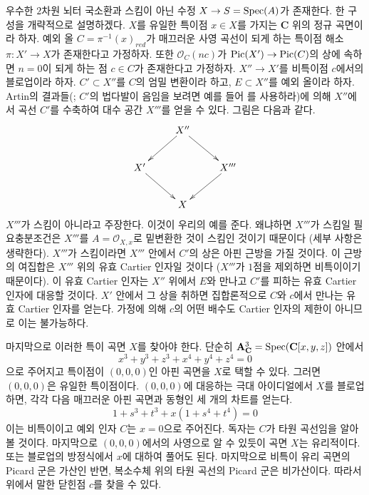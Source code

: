 \begin{example}
\label{example-not-blow-up}
우수한 $2$차원 뇌터 국소환과 스킴이 아닌 수정
$X \to S = \mathop{\mathrm{Spec}}(A)$가 존재한다.
한 구성을 개략적으로 설명하겠다. $X$를 유일한 특이점
$x \in X$를 가지는 $\mathbf{C}$ 위의 정규 곡면이라 하자.
예외 올 $C = \pi^{-1}(x)_{red}$가 매끄러운 사영 곡선이 되게 하는
특이점 해소 $\pi : X' \to X$가 존재한다고 가정하자.
또한 $\mathcal{O}_C(nc)$가 $\mathop{\mathrm{Pic}}\nolimits(X') \to \mathop{\mathrm{Pic}}\nolimits(C)$의 상에 속하면
$n = 0$이 되게 하는 점 $c \in C$가 존재한다고 가정하자.
$X'' \to X'$를 비특이점 $c$에서의 블로업이라 하자.
$C' \subset X''$를 $C$의 엄밀 변환이라 하고,
$E \subset X''$를 예외 올이라 하자.
Artin의 결과들(\cite{ArtinII}; $C'$의 법다발이 음임을 보려면
예를 들어 \cite{Mumford-topology}를 사용하라)에 의해
$X''$에서 곡선 $C'$를 수축하여 대수 공간 $X'''$를 얻을 수 있다.
그림은 다음과 같다.
$$
\xymatrix{
& X'' \ar[ld] \ar[rd] \\
X' \ar[rd] &  & X''' \ar[ld] \\
& X
}
$$
$X'''$가 스킴이 아니라고 주장한다. 이것이 우리의 예를 준다.
왜냐하면 $X'''$가 스킴일 필요충분조건은
$X'''$를 $A = \mathcal{O}_{X, x}$로 밑변환한 것이 스킴인 것이기 때문이다
(세부 사항은 생략한다).
$X'''$가 스킴이라면 $X'''$ 안에서 $C'$의 상은 아핀 근방을 가질 것이다.
이 근방의 여집합은 $X'''$ 위의 유효 Cartier 인자일 것이다
($X'''$가 $1$점을 제외하면 비특이이기 때문이다).
이 유효 Cartier 인자는 $X''$ 위에서 $E$와 만나고 $C'$를 피하는
유효 Cartier 인자에 대응할 것이다.
$X'$ 안에서 그 상을 취하면 집합론적으로 $C$와 $c$에서 만나는
유효 Cartier 인자를 얻는다.
가정에 의해 $c$의 어떤 배수도 Cartier 인자의 제한이 아니므로 이는 불가능하다.

\medskip\noindent
마지막으로 이러한 특이 곡면 $X$를 찾아야 한다.
단순히 $\mathbf{A}^3_\mathbf{C} = \mathop{\mathrm{Spec}}(\mathbf{C}[x, y, z])$ 안에서
$$
x^3 + y^3 + z^3 + x^4 + y^4 + z^4 = 0
$$
으로 주어지고 특이점이 $(0, 0, 0)$인 아핀 곡면을 $X$로 택할 수 있다.
그러면 $(0, 0, 0)$은 유일한 특이점이다.
$(0, 0, 0)$에 대응하는 극대 아이디얼에서 $X$를 블로업하면,
각각 다음 매끄러운 아핀 곡면과 동형인 세 개의 차트를 얻는다.
$$
1 + s^3 + t^3 + x(1 + s^4 + t^4) = 0
$$
이는 비특이이고 예외 인자 $C$는 $x = 0$으로 주어진다.
독자는 $C$가 타원 곡선임을 알아볼 것이다.
마지막으로 $(0, 0, 0)$에서의 사영으로 알 수 있듯이 곡면 $X$는 유리적이다.
또는 블로업의 방정식에서 $x$에 대하여 풀어도 된다.
마지막으로 비특이 유리 곡면의 Picard 군은 가산인 반면,
복소수체 위의 타원 곡선의 Picard 군은 비가산이다.
따라서 위에서 말한 닫힌점 $c$를 찾을 수 있다.
\end{example}












